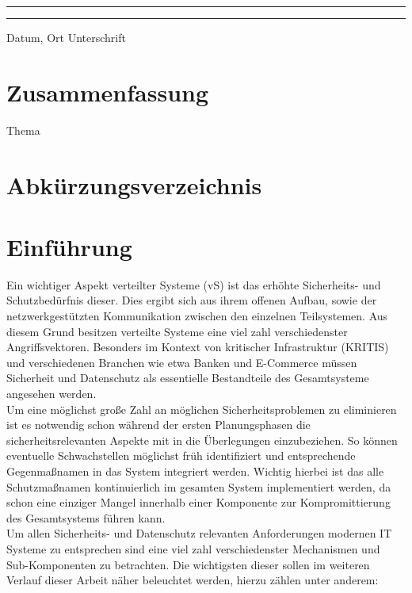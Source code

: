 \documentclass[12pt,a4paper,parskip=half]{scrreprt}
\begin{document}
	\vfill
	\noindent\rule{5cm}{.4pt}\hfill\rule{5cm}{.4pt}\par
	\noindent Datum, Ort \hfill Unterschrift 
	
	\newpage
	\thispagestyle{empty}
	\chapter*{Zusammenfassung}
	
	Thema
	\\
	\bigskip
	
	\tableofcontents
	
	\listoffigures
	
	\newpage
	\chapter*{Abkürzungsverzeichnis}
	\begin{acronym}[HTTP]
	\end{acronym}
	
	
	\chapter{Einführung}
	
	Ein wichtiger Aspekt verteilter Systeme (vS) ist das erhöhte Sicherheits- und Schutzbedürfnis dieser. Dies ergibt sich aus ihrem offenen Aufbau, sowie der netzwerkgestützten Kommunikation zwischen den einzelnen Teilsystemen. Aus diesem Grund besitzen verteilte Systeme eine viel zahl verschiedenster Angriffsvektoren. Besonders im Kontext von kritischer Infrastruktur (KRITIS) und verschiedenen Branchen wie etwa Banken und E-Commerce müssen Sicherheit und Datenschutz als essentielle Bestandteile des Gesamtsysteme angesehen werden.
	\\
	Um eine möglichst große Zahl an möglichen Sicherheitsproblemen zu eliminieren ist es notwendig schon während der ersten Planungsphasen die sicherheitsrelevanten Aspekte mit in die Überlegungen einzubeziehen. So können eventuelle Schwachstellen möglichst früh identifiziert und entsprechende Gegenmaßnamen in das System integriert werden. Wichtig hierbei ist das alle Schutzmaßnamen kontinuierlich im gesamten System implementiert werden, da schon eine einziger Mangel innerhalb einer Komponente zur Kompromittierung des Gesamtsystems führen kann.
	\\
	Um allen Sicherheits- und Datenschutz relevanten Anforderungen modernen IT Systeme zu entsprechen sind eine viel zahl verschiedenster Mechanismen und Sub-Komponenten zu betrachten. Die wichtigsten dieser sollen im weiteren Verlauf dieser Arbeit näher beleuchtet werden, hierzu zählen unter anderem:
	
\end{document}

